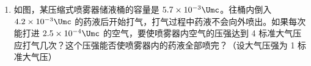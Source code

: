\documentclass[\gkver]{gaokaozhenti}
\begin{document}
\begin{enumerate}
\begin{enumerate}
	\item
	无水  为深蓝色，吸水后变为粉红色的水合物，水合物受热后又变成无水 ，故常在实验室中用作吸湿剂和空气湿度指示剂。
	
	\[ {\ce{CoCl2}}_{\text{深蓝色}}\ce{->[\text{吸水}][\triangle]}{\ce{CoCl2}}_{\text{粉红色}}\cdot x\ce{H2O} \]
	
	现有无水  $65\Ug$，吸水后变成  $119\Ug$，水合物中 $x$ 的值是 。
	
	\item
	 是典型的 $\gamma$ 放射源，可用于作物诱变育种。我国应用该方法培育出了许多农作物新品种，如棉花高产品种“鲁棉 1 号”，年种植面积曾达到 3000 多万亩，在我国自己培育的棉花品种中栽培面积最大。$\gamma$ 射线处理作物后主要引起 ，从而产生可遗传的变异。除 $\gamma$ 射线，用于人工诱变的其它射线还有 、 和 。
\end{enumerate}



\item
如图，某压缩式喷雾器储液桶的容量是 $5.7\times10^{-3}\Umc$。往桶内倒入 $4.2\times10^{-3}\Umc$ 的药液后开始打气，打气过程中药液不会向外喷出。如果每次能打进 $2.5\times10^{-4}\Umc$ 的空气，要使喷雾器内空气的压强达到 4 标准大气压应打气几次？这个压强能否使喷雾器内的药液全部喷完？（设大气压强为 1 标准大气压）


\end{enumerate}
\end{document}
